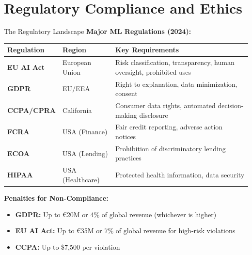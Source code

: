 
\section{Regulatory Compliance and Ethics}

\begin{frame}{The Regulatory Landscape}
\textbf{Major ML Regulations (2024):}

\begin{table}
\centering
\small
\begin{tabular}{p{2.5cm}p{3cm}p{5cm}}
\toprule
\textbf{Regulation} & \textbf{Region} & \textbf{Key Requirements} \\
\midrule
\textbf{EU AI Act} & European Union & Risk classification, transparency, human oversight, prohibited uses \\
\midrule
\textbf{GDPR} & EU/EEA & Right to explanation, data minimization, consent \\
\midrule
\textbf{CCPA/CPRA} & California & Consumer data rights, automated decision-making disclosure \\
\midrule
\textbf{FCRA} & USA (Finance) & Fair credit reporting, adverse action notices \\
\midrule
\textbf{ECOA} & USA (Lending) & Prohibition of discriminatory lending practices \\
\midrule
\textbf{HIPAA} & USA (Healthcare) & Protected health information, data security \\
\bottomrule
\end{tabular}
\end{table}

\vspace{0.3cm}
\textbf{Penalties for Non-Compliance:}
\begin{itemize}
\item \textbf{GDPR:} Up to €20M or 4\% of global revenue (whichever is higher)
\item \textbf{EU AI Act:} Up to €35M or 7\% of global revenue for high-risk violations
\item \textbf{CCPA:} Up to \$7,500 per violation
\end{itemize}
\end{frame}

